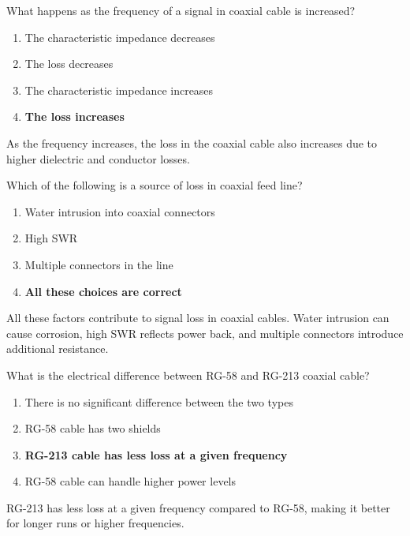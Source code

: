 \begin{tcolorbox}[colback=gray!10!white,colframe=black!75!black,title={T9B05}]
What happens as the frequency of a signal in coaxial cable is increased?
\begin{enumerate}[label=\Alph*),noitemsep]
    \item The characteristic impedance decreases
    \item The loss decreases
    \item The characteristic impedance increases
    \item \textbf{The loss increases}
\end{enumerate}
\end{tcolorbox}
As the frequency increases, the loss in the coaxial cable also increases due to higher dielectric and conductor losses.

\begin{tcolorbox}[colback=gray!10!white,colframe=black!75!black,title={T9B08}]
Which of the following is a source of loss in coaxial feed line?
\begin{enumerate}[label=\Alph*),noitemsep]
    \item Water intrusion into coaxial connectors
    \item High SWR
    \item Multiple connectors in the line
    \item \textbf{All these choices are correct}
\end{enumerate}
\end{tcolorbox}
All these factors contribute to signal loss in coaxial cables. Water intrusion can cause corrosion, high SWR reflects power back, and multiple connectors introduce additional resistance.

\begin{tcolorbox}[colback=gray!10!white,colframe=black!75!black,title={T9B10}]
What is the electrical difference between RG-58 and RG-213 coaxial cable?
\begin{enumerate}[label=\Alph*),noitemsep]
    \item There is no significant difference between the two types
    \item RG-58 cable has two shields
    \item \textbf{RG-213 cable has less loss at a given frequency}
    \item RG-58 cable can handle higher power levels
\end{enumerate}
\end{tcolorbox}
RG-213 has less loss at a given frequency compared to RG-58, making it better for longer runs or higher frequencies.

